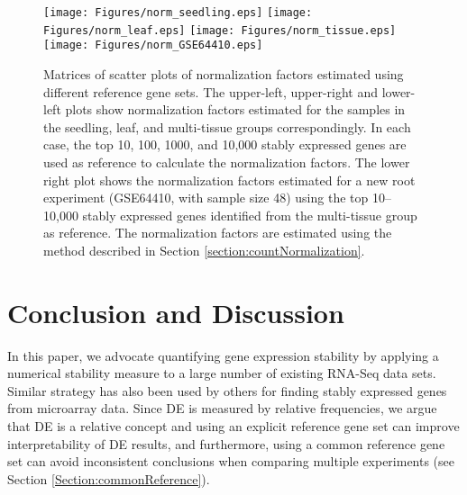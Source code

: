 				\begin{figure}[!ht]
					\begin{center}
						\texttt{[image: Figures/norm\_seedling.eps]}
						\texttt{[image: Figures/norm\_leaf.eps]}
						\texttt{[image: Figures/norm\_tissue.eps]}
						\texttt{[image: Figures/norm\_GSE64410.eps]}
						\caption{Matrices of scatter plots of normalization factors
							estimated using different reference gene sets. 
							The upper-left, upper-right and lower-left plots show
							normalization factors estimated for the samples in the
							seedling, leaf, and multi-tissue groups correspondingly. 
							In each case, the top 10, 100, 1000, and 10,000 stably
							expressed genes are used as reference to
							calculate the normalization factors.
							The lower right plot shows the normalization factors estimated for a new root
							experiment (GSE64410, with sample size 48) using the top 10--10,000
							stably expressed genes identified from the multi-tissue group as
							reference. The normalization factors are estimated using the
							method described in Section \ref{section:countNormalization}.}
						\label{fig:normfactor} \end{center} \end{figure}
				
				\section{Conclusion and Discussion}\label{section:discussion}
				In this paper, we advocate quantifying gene expression stability by applying a
				numerical stability measure to a large number of existing RNA-Seq data sets.
				Similar strategy has also been used by others for finding stably expressed
				genes from microarray data. Since DE is measured by relative frequencies, we
				argue that DE is a relative concept and using an explicit reference gene set
				can improve interpretability of DE results, and furthermore,  using a common
				reference gene set can avoid inconsistent conclusions when comparing multiple
				experiments (see Section \ref{Section:commonReference}).
				
				

